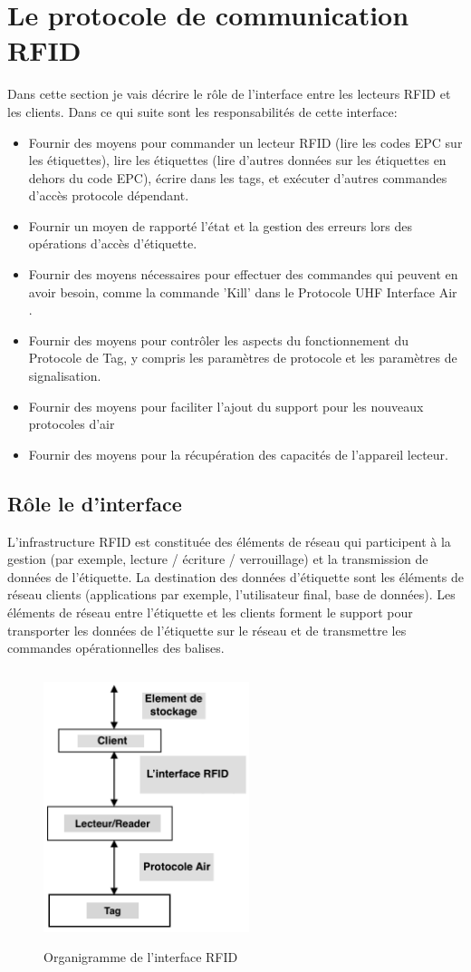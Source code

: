 \documentclass[11pt, a4paper, twoside]{book}
\begin{document}
\section{Le protocole de communication RFID}
Dans cette section je vais décrire le rôle de l'interface entre les lecteurs RFID et les clients. Dans ce qui suite sont les responsabilités de cette interface:
\begin{itemize}
\item Fournir des moyens pour commander un lecteur RFID  (lire les codes EPC sur les étiquettes), lire les étiquettes (lire d'autres données sur les étiquettes en dehors du code EPC), écrire dans les tags, et exécuter d'autres commandes d'accès protocole dépendant.
\item 
Fournir un moyen de rapporté l'état et la gestion des erreurs lors des opérations d'accès d'étiquette.
\item 
Fournir des moyens  nécessaires pour effectuer des commandes qui peuvent en avoir besoin, comme la commande 'Kill' dans le Protocole UHF Interface Air \cite{air}.
\item 
Fournir des moyens pour contrôler les aspects du fonctionnement du Protocole de Tag, y compris les paramètres de protocole et les paramètres de signalisation.
\item 
Fournir des moyens pour faciliter l'ajout du support pour les nouveaux protocoles d'air
\item 
Fournir des moyens pour la récupération des capacités de l'appareil lecteur.\\
\end{itemize}
\subsection{Rôle le d'interface}
L'infrastructure RFID est constituée des éléments de réseau qui participent à la gestion (par exemple, lecture / écriture / verrouillage) et la transmission de données de l'étiquette. La destination des données d'étiquette sont les éléments de réseau clients (applications par exemple, l'utilisateur final, base de données). Les éléments de réseau entre l'étiquette et les clients forment le support pour transporter les données de l'étiquette sur le réseau et de transmettre les commandes opérationnelles des balises.
\begin{figure}[H]
\centering
\includegraphics[width=6cm,height=8cm]{orga}
\caption{Organigramme de l'interface RFID}
\end{figure}
\end{document}
